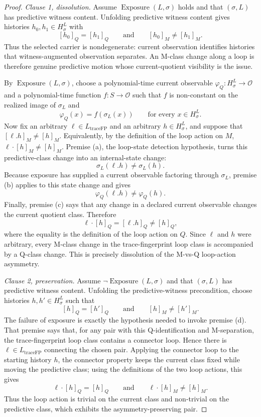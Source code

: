 \documentclass[11pt]{article}
\newcommand{\Substrate}{\sigma}             \newcommand{\Lift}{L}                       \newcommand{\LiftState}{\sigma_{L}}         \newcommand{\HistorySpace}{H_{\Substrate}^{\Lift}}
\newcommand{\Qclass}[1]{[#1]_{Q}}
\newcommand{\Mclass}[1]{[#1]_{M}}
\newcommand{\CurrentObservable}{\varphi_{Q}}    \newcommand{\Exposure}{\operatorname{Exposure}}
\newcommand{\TraceFPLoopClass}{L_{\mathrm{traceFP}}}
\newcommand{\LoopActionQ}[2]{#1\cdot\Qclass{#2}}
\newcommand{\LoopActionM}[2]{#1\cdot\Mclass{#2}}
\theoremstyle{definition}
\begin{document}
\begin{proof}
\emph{Clause 1, dissolution.}  Assume \(\Exposure(\Lift,\Substrate)\)
holds and that \((\Substrate,\Lift)\) has predictive witness content.
Unfolding predictive witness content gives histories
\(h_{0},h_{1}\in\HistorySpace\) with
\[
  \Qclass{h_{0}}=\Qclass{h_{1}}
  \qquad\text{and}\qquad
  \Mclass{h_{0}}\neq\Mclass{h_{1}} .
\]
Thus the selected carrier is nondegenerate: current observation
identifies histories that witness-augmented observation separates.  An
M-class change along a loop is therefore genuine predictive motion
whose current-quotient visibility is the issue.

By \(\Exposure(\Lift,\Substrate)\), choose a polynomial-time current
observable \(\CurrentObservable:\HistorySpace\to\mathcal O\) and a
polynomial-time function \(f:S\to\mathcal O\) such that \(f\) is
non-constant on the realized image of \(\LiftState\) and
\[
  \CurrentObservable(x)=f(\LiftState(x))
  \qquad\text{for every }x\in\HistorySpace .
\]
Now fix an arbitrary \(\ell\in\TraceFPLoopClass\) and an arbitrary
\(h\in\HistorySpace\), and suppose that
\(\Mclass{\ell.h}\neq\Mclass{h}\).  Equivalently, by the definition of
the loop action on \(M\),
\(\LoopActionM{\ell}{h}\neq\Mclass{h}\).  Premise (a), the loop-state
detection hypothesis, turns this predictive-class change into an
internal-state change:
\[
  \LiftState(\ell.h)\neq\LiftState(h).
\]
Because exposure has supplied a current observable factoring through
\(\LiftState\), premise (b) applies to this state change and gives
\[
  \CurrentObservable(\ell.h)\neq\CurrentObservable(h).
\]
Finally, premise (c) says that any change in a declared current
observable changes the current quotient class.  Therefore
\[
  \LoopActionQ{\ell}{h}=\Qclass{\ell.h}\neq\Qclass{h},
\]
where the equality is the definition of the loop action on \(Q\).
Since \(\ell\) and \(h\) were arbitrary, every M-class change in the
trace-fingerprint loop class is accompanied by a Q-class change.  This
is precisely dissolution of the M-vs-Q loop-action asymmetry.

\emph{Clause 2, preservation.}  Assume
\(\neg\Exposure(\Lift,\Substrate)\) and that \((\Substrate,\Lift)\)
has predictive witness content.  Unfolding the predictive-witness
precondition, choose histories \(h,h'\in\HistorySpace\) such that
\[
  \Qclass{h}=\Qclass{h'}
  \qquad\text{and}\qquad
  \Mclass{h}\neq\Mclass{h'} .
\]
The failure of exposure is exactly the hypothesis needed to invoke
premise (d).  That premise says that, for any pair with this
Q-identification and M-separation, the trace-fingerprint loop class
contains a connector loop.  Hence there is
\(\ell\in\TraceFPLoopClass\) connecting the chosen pair.  Applying the
connector loop to the starting history \(h\), the connector property
keeps the current class fixed while moving the predictive class; using
the definitions of the two loop actions, this gives
\[
  \LoopActionQ{\ell}{h}=\Qclass{h}
  \qquad\text{and}\qquad
  \LoopActionM{\ell}{h}\neq\Mclass{h}.
\]
Thus the loop action is trivial on the current class and non-trivial
on the predictive class, which exhibits the asymmetry-preserving pair.


\end{proof}
\end{document}
